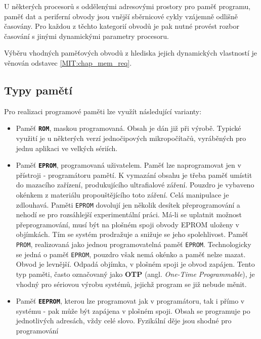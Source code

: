     U některých procesorů s oddělenými adresovými prostory pro paměť programu, paměť dat a 
    periferní obvody jsou vnější sběrnicové cykly vzájemně odlišně časovány. Pro každou z těchto 
    kategorií obvodů je pak nutné provést rozbor časování s jinými dynamickými parametry procesoru.
    
    Výběru vhodných paměťových obvodů z hlediska jejich dynamických vlastností je věnován odstavec 
    \ref{MIT:chap_mem_req}.
    
    \subsection{Typy pamětí}
      Pro realizaci programové paměti lze využít následující varianty:
      \begin{itemize}[noitemsep]
        \item Paměť \textbf{\texttt{ROM}}, maskou programovaná. Obsah je dán již při výrobě.        
              Typické využití je u některých verzí jednočipových mikropočítačů, vyráběných pro 
              jednu aplikaci ve velkých sériích.
        \item Paměť \textbf{\texttt{EPROM}}, programovaná uživatelem. Paměť lze naprogramovat jen 
              v přístroji - programátoru pamětí. K vymazání obsahu je třeba paměť umístit do 
              mazacího zařízení, produkujícího ultrafialové záření. Pouzdro je vybaveno okénkem z 
              materiálu propouštějícího toto záření. Celá manipulace je zdlouhavá. Paměti 
              \texttt{EPROM} dovolují jen několik desítek přeprogramování a nehodí se pro 
              rozsáhlejší experimentální práci. Má-li se uplatnit možnost přeprogramování, musí být 
              na plošném spoji obvody EPROM uloženy v objímkách. Tím se systém prodražuje a 
              snižuje se jeho spolehlivost. Paměť \texttt{PROM}, realizovaná jako jednou 
              programovatelná paměť \texttt{EPROM}. Technologicky se jedná o paměť \texttt{EPROM}, 
              pouzdro však nemá okénko a paměť nelze mazat. Obvod je levnější. Odpadá objímka, v 
              plošném spoji je obvod zapájen. Tento typ paměti, často označovaný jako \textbf{OTP} 
              (angl. \emph{One-Time Programmable}), je vhodný pro sériovou výrobu systémů, jejichž 
              program se již nebude měnit.
        \item Paměť \textbf{\texttt{EEPROM}}, kterou lze programovat jak v programátoru, tak i přímo
              v systému - pak může být zapájena v plošném spoji. Obsah se programuje po 
              jednotlivých adresách, vždy celé slovo. Fyzikální děje jsou shodné pro programování 

\end{itemize}
